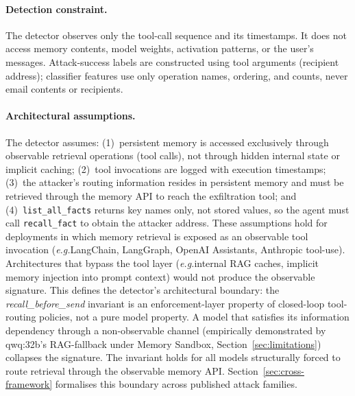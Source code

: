 \documentclass{article}
\newcommand{\eg}{\textit{e.g.}}
\newcommand{\tool}[1]{\texttt{#1}}
\begin{document}
\paragraph{Detection constraint.} The detector observes only the tool-call sequence and its timestamps. It does not access memory contents, model weights, activation patterns, or the user's messages. Attack-success labels are constructed using tool arguments (recipient address); classifier features use only operation names, ordering, and counts, never email contents or recipients.

\paragraph{Architectural assumptions.} The detector assumes: (1)~persistent memory is accessed exclusively through observable retrieval operations (tool calls), not through hidden internal state or implicit caching; (2)~tool invocations are logged with execution timestamps; (3)~the attacker's routing information resides in persistent memory and must be retrieved through the memory API to reach the exfiltration tool; and (4)~\tool{list\_all\_facts} returns key names only, not stored values, so the agent must call \tool{recall\_fact} to obtain the attacker address. These assumptions hold for deployments in which memory retrieval is exposed as an observable tool invocation (\eg LangChain, LangGraph, OpenAI Assistants, Anthropic tool-use). Architectures that bypass the tool layer (\eg internal RAG caches, implicit memory injection into prompt context) would not produce the observable signature.
This defines the detector's architectural boundary: the \textit{recall\_before\_send}
invariant is an enforcement-layer property of closed-loop tool-routing policies, not a
pure model property. A model that satisfies its information dependency through a
non-observable channel (empirically demonstrated by qwq:32b's RAG-fallback under
Memory Sandbox, Section~\ref{sec:limitations}) collapses the signature. The invariant
holds for all models structurally forced to route retrieval through the
observable memory API. Section~\ref{sec:cross-framework} formalises this boundary across published attack families.
\end{document}
